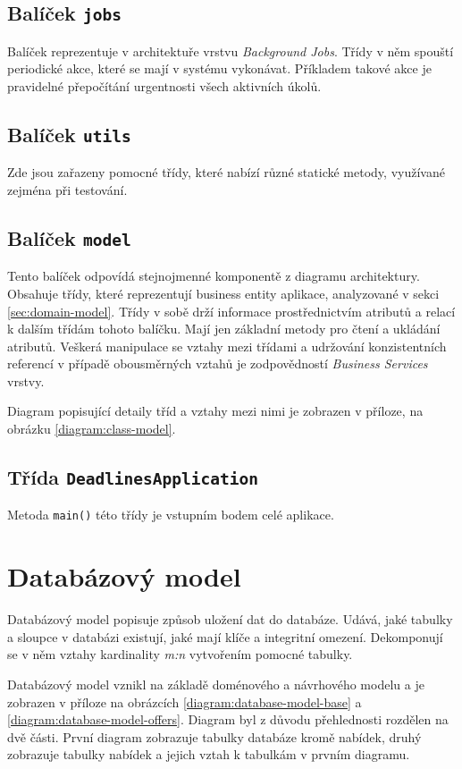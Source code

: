 \documentclass[thesis=B,czech]{FITthesis}[2012/06/26]
\begin{document}
		\subsection{Balíček \texttt{jobs}}
			Balíček reprezentuje v architektuře vrstvu \textit{Background Jobs}. Třídy v něm spouští periodické akce, které se mají v systému vykonávat. Příkladem takové akce je pravidelné přepočítání urgentnosti všech aktivních úkolů.
			
		\subsection{Balíček \texttt{utils}}
			Zde jsou zařazeny pomocné třídy, které nabízí různé statické metody, využívané zejména při testování.
			
		\subsection{Balíček \texttt{model}}
			Tento balíček odpovídá stejnojmenné komponentě z diagramu architektury. Obsahuje třídy, které reprezentují business entity aplikace, analyzované v sekci \ref{sec:domain-model}. Třídy v sobě drží informace prostřednictvím atributů a relací k dalším třídám tohoto balíčku. Mají jen základní metody pro čtení a ukládání atributů. Veškerá manipulace se vztahy mezi třídami a udržování konzistentních referencí v případě obousměrných vztahů je zodpovědností \textit{Business Services} vrstvy. 
			
			Diagram popisující detaily tříd a vztahy mezi nimi je zobrazen v příloze, na obrázku \ref{diagram:class-model}.
			
		\subsection{Třída \texttt{DeadlinesApplication}}
			Metoda \texttt{main()} této třídy je vstupním bodem celé aplikace.
		
		
	
	\section{Databázový model}
		Databázový model popisuje způsob uložení dat do databáze. Udává, jaké tabulky a sloupce v databázi existují, jaké mají klíče a integritní omezení. Dekomponují se v něm vztahy kardinality \textit{m:n} vytvořením pomocné tabulky.
		
		Databázový model vznikl na základě doménového a návrhového modelu a je zobrazen v příloze na obrázcích \ref{diagram:database-model-base} a \ref{diagram:database-model-offers}. Diagram byl z důvodu přehlednosti rozdělen na dvě části. První diagram zobrazuje tabulky databáze kromě nabídek, druhý zobrazuje tabulky nabídek a jejich vztah k tabulkám v prvním diagramu.
		
\end{document}
